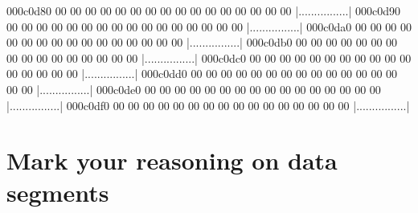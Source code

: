 \documentclass{article}
\begin{document}
\begin{hexlsting}
        000c0d80  00 00 00 00 00 00 00 00  00 00 00 00 00 00 00 00  |................|
        000c0d90  00 00 00 00 00 00 00 00  00 00 00 00 00 00 00 00  |................|
        000c0da0  00 00 00 00 00 00 00 00  00 00 00 00 00 00 00 00  |................|
        000c0db0  00 00 00 00 00 00 00 00  00 00 00 00 00 00 00 00  |................|
        000c0dc0  00 00 00 00 00 00 00 00  00 00 00 00 00 00 00 00  |................|
        000c0dd0  00 00 00 00 00 00 00 00  00 00 00 00 00 00 00 00  |................|
        000c0de0  00 00 00 00 00 00 00 00  00 00 00 00 00 00 00 00  |................|
        000c0df0  00 00 00 00 00 00 00 00  00 00 00 00 00 00 00 00  |................|
    \end{hexlsting}

    \section{Mark your reasoning on data segments}\label{sec:new_fat}
\end{document}
